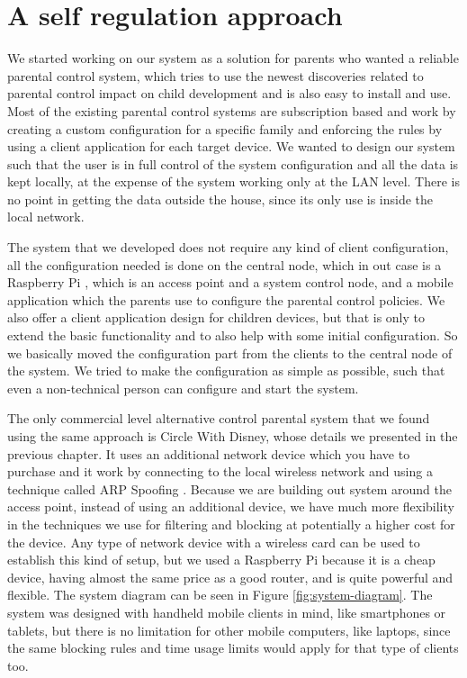 
\chapter{A self regulation approach} %

\label{Chapter3} %

We started working on our system as a solution for parents who wanted a reliable parental control system, which tries to use the newest discoveries related to parental control impact on child development and is also easy to install and use. Most of the existing parental control systems are subscription based and work by creating a custom configuration for a specific family and enforcing the rules by using a client application for each target device. We wanted to design our system such that the user is in full control of the system configuration and all the data is kept locally, at the expense of the system working only at the LAN level. There is no point in getting the data outside the house, since its only use is inside the local network. 

The system that we developed does not require any kind of client configuration, all the configuration needed is done on the central node, which in out case is a Raspberry Pi \citep{raspberryPi}, which is an access point and a system control node, and a mobile application which the parents use to configure the parental control policies. We also offer a client application design for children devices, but that is only to extend the basic functionality and to also help with some initial configuration. So we basically moved the configuration part from the clients to the central node of the system. We tried to make the configuration as simple as possible, such that even a non-technical person can configure and start the system. 

The only commercial level alternative control parental system that we found using the same approach is Circle With Disney, whose details we presented in the previous chapter. It uses an additional network device which you have to purchase and it work by connecting to the local wireless network and using a technique called ARP Spoofing \citep{lockhart2004network}. Because we are building out system around the access point, instead of using an additional device, we have much more flexibility in the techniques we use for filtering and blocking at potentially a higher cost for the device. Any type of network device with a wireless card can be used to establish this kind of setup, but we used a Raspberry Pi because it is a cheap device, having almost the same price as a good router, and is quite powerful and flexible. The system diagram can be seen in Figure \ref{fig:system-diagram}. The system was designed with handheld mobile clients in mind, like smartphones or tablets, but there is no limitation for other mobile computers, like laptops, since the same blocking rules and time usage limits would apply for that type of clients too.

